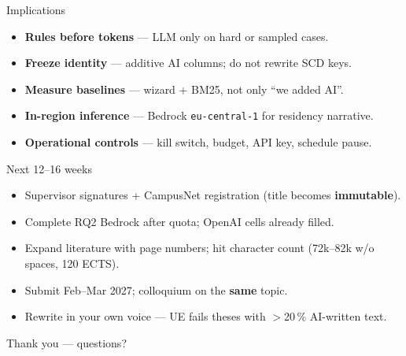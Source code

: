 \documentclass[aspectratio=169,11pt]{beamer}
\begin{document}
\begin{frame}{Implications}
  \begin{itemize}
    \item \textbf{Rules before tokens} --- LLM only on hard or sampled cases.
    \item \textbf{Freeze identity} --- additive AI columns; do not rewrite SCD keys.
    \item \textbf{Measure baselines} --- wizard + BM25, not only ``we added AI''.
    \item \textbf{In-region inference} --- Bedrock \texttt{eu-central-1} for residency narrative.
    \item \textbf{Operational controls} --- kill switch, budget, API key, schedule pause.
  \end{itemize}
\end{frame}

\begin{frame}{Next 12--16 weeks}
  \begin{itemize}
    \item Supervisor signatures + CampusNet registration (title becomes \textbf{immutable}).
    \item Complete RQ2 Bedrock after quota; OpenAI cells already filled.
    \item Expand literature with page numbers; hit character count (72k--82k w/o spaces, 120 ECTS).
    \item Submit Feb--Mar 2027; colloquium on the \textbf{same} topic.
    \item Rewrite in your own voice --- UE fails theses with $>$20\,\% AI-written text.
  \end{itemize}
  \vspace{0.5em}
  \centering
  \Large Thank you --- questions?
\end{frame}
\end{document}
